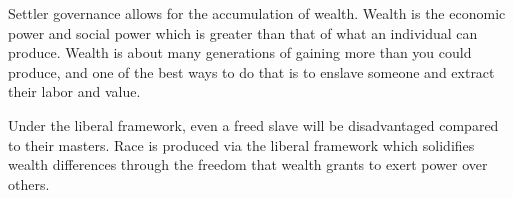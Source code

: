 \documentclass{report}
\begin{document}
\begin{description}
\begin{itemize}
                \vspace{10}

                Settler governance allows for the accumulation of wealth. Wealth
                is the economic power and social power which is greater than
                that of what an individual can produce. Wealth is about many
                generations of gaining more than you could produce, and one
                of the best ways to do that is to enslave someone and extract
                their labor and value.

                Under the liberal framework, even a freed slave will be
                disadvantaged compared to their masters. Race is produced via
                the liberal framework which solidifies wealth differences
                through the freedom that wealth grants to exert power over
                others.

        \end{itemize}
    \item {\large }
\end{description}
\end{document}
